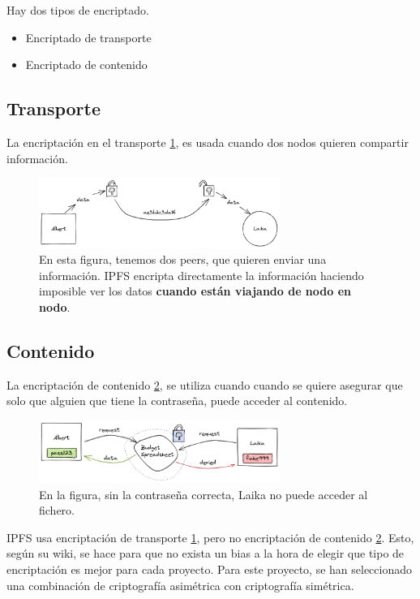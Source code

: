 Hay dos tipos de encriptado.
\begin{itemize}
    \item Encriptado de transporte
    \item Encriptado de contenido
\end{itemize}
\subsection{Transporte}
La encriptación en el transporte \ref{fg:trasnporte}, es usada cuando dos nodos quieren compartir información.
\begin{center}
    \begin{figure}[h!]
        \centering
        \includegraphics[width=0.7\textwidth]{Figures/transport-encryption.033b6a51.png}
        \caption{En esta figura, tenemos dos peers, que quieren enviar una información. IPFS \cite{web:ipfs} encripta directamente la información haciendo imposible ver los datos \textbf{cuando están viajando de nodo en nodo}.}
        \label{fg:trasnporte}
    \end{figure}
\end{center}
\subsection{Contenido}
La encriptación de contenido \ref{fg:contenido}, se utiliza cuando cuando se quiere asegurar que solo que alguien que tiene la contraseña, puede acceder al contenido.
\begin{center}
    \begin{figure}[h!]
        \centering
        \includegraphics[width=0.7\textwidth]{Figures/content-encryption.adc5de58.png}
        \caption{En la figura, sin la contraseña correcta, Laika no puede acceder al fichero.}
        \label{fg:contenido}
    \end{figure}
\end{center}
IPFS \cite{web:ipfs} usa encriptación de transporte \ref{fg:trasnporte}, pero no encriptación de contenido \ref{fg:contenido}. Esto, según su wiki, se hace para que no exista un bias a la hora de elegir que tipo de encriptación es mejor para cada proyecto.
Para este proyecto, se han seleccionado una combinación de criptografía asimétrica con criptografía simétrica.
